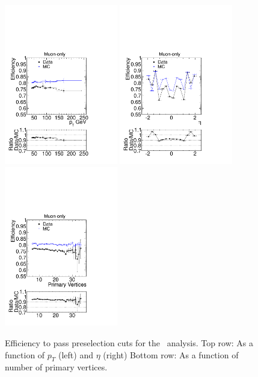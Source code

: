\begin{figure}
 \begin{center}
  \includegraphics[clip=false, trim=0.0cm 0cm 0cm 0cm, width=0.44\textwidth]{figures/muonly/pteff_Comp}
  \includegraphics[clip=false, trim=0.0cm 0cm 0cm 0cm, width=0.44\textwidth]{figures/muonly/etaeff_Comp}
  \includegraphics[clip=false, trim=0.0cm 0cm 0cm 0cm, width=0.44\textwidth]{figures/muonly/PVeff_Comp}
 \end{center}
 \caption[Efficiency to pass preselection cuts for the \muononly\ analysis as a function of \pt, $\eta$, and number of primary vertices]
{Efficiency to pass preselection cuts for the \muononly\ analysis.
Top row: As a function of $p_T$ (left) and $\eta$ (right)
Bottom row: As a function of number of primary vertices.}
   \label{fig:MuOnlyTagProbeEff}
\end{figure}